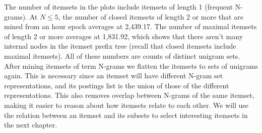 \documentclass[letterpaper,12pt,titlepage,oneside,final]{book}
\begin{document}
The number of itemsets in the plots include 
itemsets of length 1 (frequent N-grams). 
At $N \le 5$, the number of closed itemsets of length 2 or more
that are mined from an hour epoch averages at 2,439.17.
The number of maximal itemsets of length 2 or more
averages at 1,831.92, 
which shows that there aren't many internal nodes
in the itemset prefix tree 
(recall that closed itemsets include maximal itemsets).
All of these numbers are counts of distinct unigram sets.
After mining itemsets of term N-grams we flatten the itemsets to sets of unigrams again.
This is necessary since an itemset will have different N-gram set representations,
and its postings list is the union of those of the different representations.
This also removes overlap between N-grams of the same itemset,
making it easier to reason about how itemsets relate to each other.
We will use the relation between an itemset and its subsets to
select interesting itemsets in the next chapter.


\end{document}
